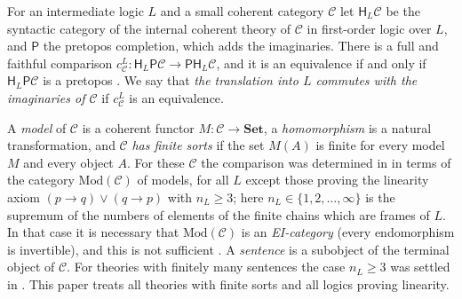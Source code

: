 \documentclass[11pt]{amsart}
\theoremstyle{definition}
\newcommand{\Set}{\mathbf{Set}}
\newcommand{\Mod}{\mathrm{Mod}}
\newcommand{\PP}{\mathsf P}
\newcommand{\HH}{\mathsf H}
\newcommand{\cC}{\mathcal C}
\begin{document}
For an intermediate logic $L$ and a small coherent category $\cC$ let
$\HH_L\cC$ be the syntactic category of the internal coherent theory of
$\cC$ in first-order logic over $L$, and $\PP$ the pretopos completion,
which adds the imaginaries. There is a full and faithful comparison
$c^L_\cC\colon\HH_L\PP\cC\to\PP\HH_L\cC$, and it is an equivalence if
and only if $\HH_L\PP\cC$ is a pretopos \cite[Lemma~2.2]{Interm}. We
say that \emph{the translation into $L$ commutes with the imaginaries
of $\cC$} if $c^L_\cC$ is an equivalence.

A \emph{model} of $\cC$ is a coherent functor $M\colon\cC\to\Set$, a
\emph{homomorphism} is a natural transformation, and $\cC$ \emph{has
finite sorts} if the set $M(A)$ is finite for every model $M$ and
every object $A$. For these $\cC$ the comparison was determined in
\cite{Finsorts} in terms of the category $\Mod(\cC)$ of models, for
all $L$ except those proving the linearity axiom $(p\to q)\vee(q\to
p)$ with $n_L\ge3$; here $n_L\in\{1,2,\dots,\infty\}$ is the supremum
of the numbers of elements of the finite chains which are frames of
$L$. In that case it is necessary that $\Mod(\cC)$ is an
\emph{EI-category} (every endomorphism is invertible), and this is not
sufficient \cite{Strings}. A \emph{sentence} is a subobject of the
terminal object of $\cC$. For theories with finitely many sentences
the case $n_L\ge3$ was settled in \cite{Proftrees}. This paper treats
all theories with finite sorts and all logics proving linearity.
\end{document}
